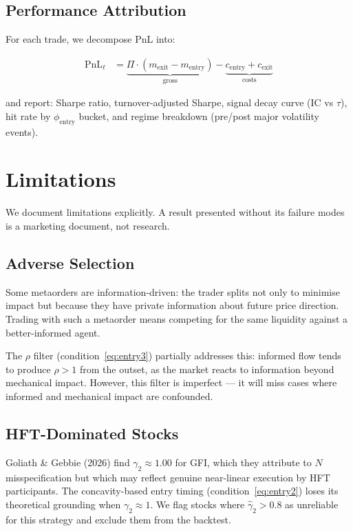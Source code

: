 \documentclass[12pt,a4paper]{article}
\begin{document}
\subsection{Performance Attribution}

For each trade, we decompose PnL into:

\begin{align}
  \text{PnL}_\ell &= \underbrace{\Pi \cdot (m_{\text{exit}} - m_{\text{entry}})}_{\text{gross}} - \underbrace{c_{\text{entry}} + c_{\text{exit}}}_{\text{costs}} \label{eq:pnl}
\end{align}

\noindent and report: Sharpe ratio, turnover-adjusted Sharpe, signal decay
curve (IC vs $\tau$), hit rate by $\phi_{\text{entry}}$ bucket, and regime
breakdown (pre/post major volatility events).

\section{Limitations}
\label{sec:limitations}

We document limitations explicitly. A result presented without its failure
modes is a marketing document, not research.

\subsection{Adverse Selection}

Some metaorders are information-driven: the trader splits not only to minimise
impact but because they have private information about future price direction.
Trading with such a metaorder means competing for the same liquidity against a
better-informed agent.

The $\rho$ filter (condition~\eqref{eq:entry3}) partially addresses this:
informed flow tends to produce $\rho > 1$ from the outset, as the market reacts
to information beyond mechanical impact. However, this filter is imperfect ---
it will miss cases where informed and mechanical impact are confounded.

\subsection{HFT-Dominated Stocks}

Goliath \& Gebbie (2026) find $\gamma_2 \approx 1.00$ for GFI, which they
attribute to $N$ misspecification but which may reflect genuine near-linear
execution by HFT participants. The concavity-based entry timing
(condition~\eqref{eq:entry2}) loses its theoretical grounding when
$\gamma_2 \approx 1$. We flag stocks where $\hat{\gamma}_2 > 0.8$ as
unreliable for this strategy and exclude them from the backtest.
\end{document}
